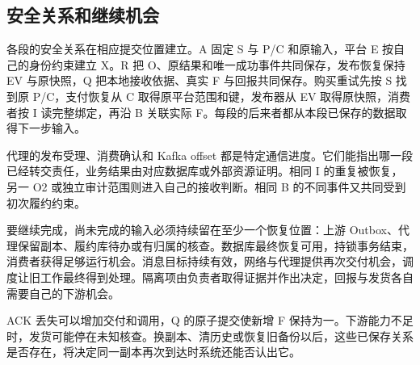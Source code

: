 
\FloatBarrier
\subsection*{安全关系和继续机会}

各段的安全关系在相应提交位置建立。A 固定 S 与 P/C 和原输入，平台 E 按自己的身份约束建立 X。R 把 O、原结果和唯一成功事件共同保存，发布恢复保持 EV 与原快照，Q 把本地接收依据、真实 F 与回报共同保存。购买重试先按 S 找到原 P/C，支付恢复从 C 取得原平台范围和键，发布器从 EV 取得原快照，消费者按 I 读完整绑定，再沿 B 关联实际 F。每段的后来者都从本段已保存的数据取得下一步输入。

代理的发布受理、消费确认和 Kafka offset 都是特定通信进度。它们能指出哪一段已经转交责任，业务结果由对应数据库或外部资源证明。相同 I 的重复被恢复，另一 O2 或独立审计范围则进入自己的接收判断。相同 B 的不同事件又共同受到初次履约约束。

要继续完成，尚未完成的输入必须持续留在至少一个恢复位置：上游 Outbox、代理保留副本、履约库待办或有归属的核查。数据库最终恢复可用，持锁事务结束，消费者获得足够运行机会。消息目标持续有效，网络与代理提供再次交付机会，调度让旧工作最终得到处理。隔离项由负责者取得证据并作出决定，回报与发货各自需要自己的下游机会。

ACK 丢失可以增加交付和调用，Q 的原子提交使新增 F 保持为一。下游能力不足时，发货可能停在未知核查。换副本、清历史或恢复旧备份以后，这些已保存关系是否存在，将决定同一副本再次到达时系统还能否认出它。
